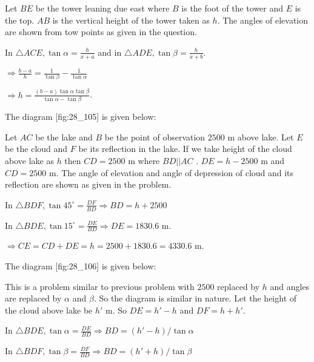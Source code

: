   \startplacefigure[reference=fig:28_104]
    \externalfigure[28_104.pdf]
  \stopplacefigure

  Let $BE$ be the tower leaning due east where $B$ is the foot of the tower and $E$ is the top. $AB$ is
  the vertical height of the tower taken as $h$. The angles of elevation are shown from tow points as given in the
  question.

  In $\triangle ACE, \tan\alpha = \frac{h}{x + a}$ and in $\triangle ADE, \tan\beta = \frac{h}{x + b}$.

  $\Rightarrow \frac{b - a}{h} = \frac{1}{\tan\beta} - \frac{1}{\tan\alpha}$

  $\Rightarrow h = \frac{(b - a)\tan\alpha\tan\beta}{\tan\alpha - \tan\beta}$.

\item The diagram [fig:28_105] is given below:

  \startplacefigure[reference=fig:28_105]
    \externalfigure[28_105.pdf]
  \stopplacefigure

  Let $AC$ be the lake and $B$ be the point of observation $2500$ m above lake. Let $E$ be the cloud and
  $F$ be its reflection in the lake. If we take height of the cloud above lake as $h$ then $CD = 2500$ m where
  $BD||AC$ . $DE = h - 2500$ m and $CD = 2500$ m. The angle of elevation and angle of depression of cloud and
  its reflection are shown as given in the problem.

  In $\triangle BDF, \tan45^\circ = \frac{DF}{BD} \Rightarrow BD = h + 2500$

  In $\triangle BDE, \tan15^\circ = \frac{DE}{BD} \Rightarrow DE = 1830.6$ m.

  $\Rightarrow CE = CD + DE = h = 2500 + 1830.6 = 4330.6$ m.

\item The diagram [fig:28_106] is given below:

  \startplacefigure[reference=fig:28_106]
    \externalfigure[28_106.pdf]
  \stopplacefigure

  This is a problem similar to previous problem with $2500$ replaced by $h$ and angles are replaced by
  $\alpha$ and $\beta$. So the diagram is similar in nature. Let the height of the cloud above lake be
  $h'$ m. So $DE = h' - h$ and $DF = h + h'$.

  In $\triangle BDE, \tan\alpha = \frac{DE}{BD}\Rightarrow BD = (h' - h)/\tan\alpha$

  In $\triangle BDF, \tan\beta = \frac{DF}{BD}\Rightarrow BD = (h' + h)/\tan\beta$

